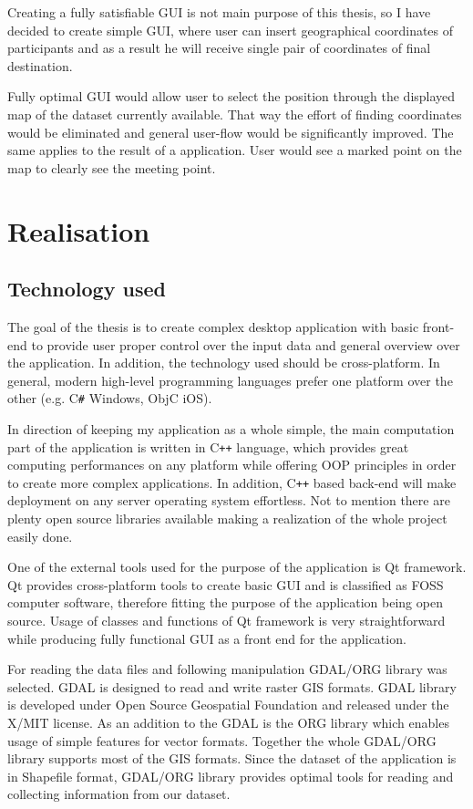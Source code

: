 \documentclass[thesis=M,english]{FITthesis}[2012/10/20]
\begin{document}
Creating a fully satisfiable GUI is not main purpose of this thesis, so I have decided to create simple GUI, where user can insert geographical coordinates of participants and as a result he will receive single pair of coordinates of final destination. 

Fully optimal GUI would allow user to select the position through the displayed map of the dataset currently available. That way the effort of finding coordinates would be eliminated and general user-flow would be significantly improved. The same applies to the result of a application. User would see a marked point on the map to clearly see the meeting point. 

\chapter{Realisation}

\section{Technology used}
The goal of the thesis is to create complex desktop application with basic front-end to provide user proper control over the input data and general overview over the application. In addition, the technology used should be cross-platform. In general, modern high-level programming languages prefer one platform over the other (e.g. C\texttt{\#} Windows, ObjC iOS). 

In direction of keeping my application as a whole simple, the main computation part of the application is written in C\texttt{++} language, which provides great computing performances on any platform while offering OOP principles in order to create more complex applications. In addition, C\texttt{++} based back-end will make deployment on any server operating system effortless. Not to mention there are plenty open source libraries available making a realization of the whole project easily done.  

One of the external tools used for the purpose of the application is Qt framework. Qt provides cross-platform tools to create basic GUI and is classified as FOSS computer software, therefore fitting the purpose of the application being open source. 
Usage of classes and functions of Qt framework is very straightforward while producing fully functional GUI as a front end for the application. 

For reading the data files and following manipulation GDAL/ORG library was selected. GDAL is designed to read and write raster GIS formats. GDAL library is developed under Open Source Geospatial Foundation and released under the X/MIT license. 
As an addition to the GDAL is the ORG library which enables usage of simple features for vector formats. Together the whole GDAL/ORG library supports most of the GIS formats. %
Since the dataset of the application is in Shapefile format, GDAL/ORG library provides optimal tools for reading and collecting information from our dataset.
\end{document}
